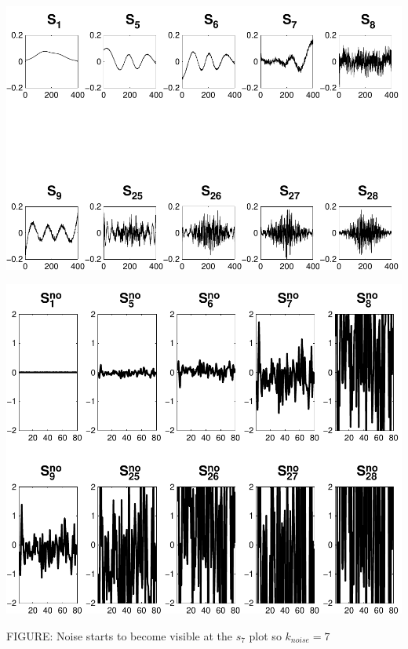 \documentclass[11pt]{amsart}
\begin{document}
	\vspace{5mm}
	\begin{minipage}[t]{0.5\textwidth}
	
		\includegraphics[width=.95\linewidth]{figures/run3/sk_plots} 
   
	\end{minipage}
	\begin{minipage}[t]{0.5\textwidth}
	
		\includegraphics[width=.75\linewidth]{figures/run3/noise_parts} 
   
	\end{minipage}
	\begin{center}
		FIGURE: 
		Noise starts to become visible at the $s_{7}$ plot so $k_{noise}=7$
	\end{center} 
	\vspace{10mm}
	
\end{document}
